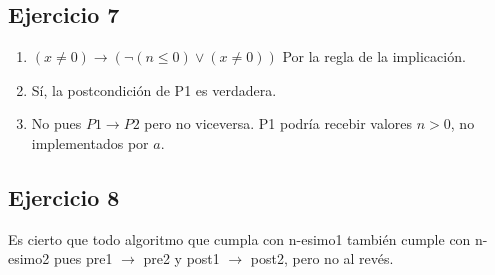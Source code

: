 \subsection{Ejercicio 7}
\begin{enumerate}
    \item $(x\neq 0) \rightarrow (\neg(n \leq 0) \vee (x \neq 0))$ Por la regla de la implicación.
    \item Sí, la postcondición de P1 es verdadera.
    \item No pues $P1 \rightarrow P2$ pero no viceversa. P1 podría recebir valores $n>0$, no implementados por $a$.
\end{enumerate}

\subsection{Ejercicio 8}
Es cierto que todo algoritmo que cumpla con n-esimo1 también cumple con n-esimo2 pues pre1 $\rightarrow$ pre2 y post1
$\rightarrow$ post2, pero no al revés.


